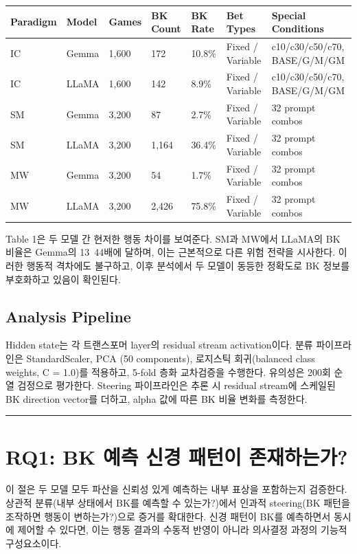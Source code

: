 \documentclass[11pt,a4paper]{article}
\begin{document}
\begin{table}[H]
\centering
\small
\begin{tabular}{|l|l|l|l|l|l|l|}
\hline
Paradigm & Model & Games & BK Count & BK Rate & Bet Types & Special Conditions \\
\hline
IC & Gemma & 1,600 & 172 & 10.8\% & Fixed / Variable & c10/c30/c50/c70, BASE/G/M/GM \\
IC & LLaMA & 1,600 & 142 & 8.9\% & Fixed / Variable & c10/c30/c50/c70, BASE/G/M/GM \\
SM & Gemma & 3,200 & 87 & 2.7\% & Fixed / Variable & 32 prompt combos \\
SM & LLaMA & 3,200 & 1,164 & 36.4\% & Fixed / Variable & 32 prompt combos \\
MW & Gemma & 3,200 & 54 & 1.7\% & Fixed / Variable & 32 prompt combos \\
MW & LLaMA & 3,200 & 2,426 & 75.8\% & Fixed / Variable & 32 prompt combos \\
\hline
\end{tabular}
\end{table}

Table 1은 두 모델 간 현저한 행동 차이를 보여준다. SM과 MW에서 LLaMA의 BK 비율은 Gemma의 13~44배에 달하며, 이는 근본적으로 다른 위험 전략을 시사한다. 이러한 행동적 격차에도 불구하고, 이후 분석에서 두 모델이 동등한 정확도로 BK 정보를 부호화하고 있음이 확인된다.

\subsection{Analysis Pipeline}

Hidden state는 각 트랜스포머 layer의 residual stream activation이다. 분류 파이프라인은 StandardScaler, PCA (50 components), 로지스틱 회귀(balanced class weights, C = 1.0)를 적용하고, 5-fold 층화 교차검증을 수행한다. 유의성은 200회 순열 검정으로 평가한다. Steering 파이프라인은 추론 시 residual stream에 스케일된 BK direction vector를 더하고, alpha 값에 따른 BK 비율 변화를 측정한다.

\bigskip\hrule\bigskip

\section{RQ1: BK 예측 신경 패턴이 존재하는가?}

이 절은 두 모델 모두 파산을 신뢰성 있게 예측하는 내부 표상을 포함하는지 검증한다. 상관적 분류(내부 상태에서 BK를 예측할 수 있는가?)에서 인과적 steering(BK 패턴을 조작하면 행동이 변하는가?)으로 증거를 확대한다. 신경 패턴이 BK를 예측하면서 동시에 제어할 수 있다면, 이는 행동 결과의 수동적 반영이 아니라 의사결정 과정의 기능적 구성요소이다.
\end{document}
